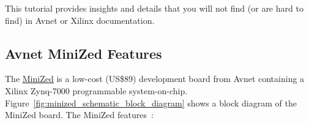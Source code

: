 This tutorial provides insights and details that you will not find (or are
hard to find) in Avnet or Xilinx documentation.

\clearpage
\subsection{Avnet MiniZed Features}

The \href{http://www.minized.org}{MiniZed} is a low-cost (US\$89) development
board from Avnet containing a Xilinx Zynq-7000 programmable system-on-chip.
%
Figure~\ref{fig:minized_schematic_block_diagram} shows a block diagram of
the MiniZed board. The MiniZed
features~\cite{Avnet_MiniZed_HW_2020,Avnet_MiniZed_Schematic_2017}:
%
